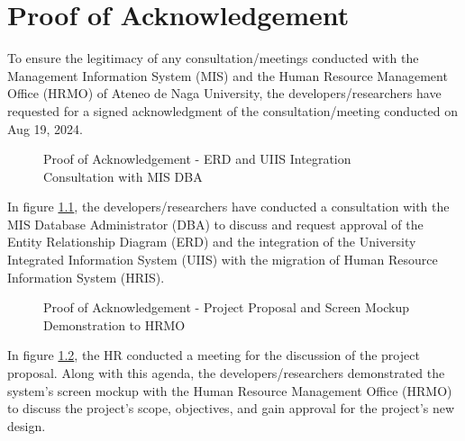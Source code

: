 \chapter{Proof of Acknowledgement}

\label{proof-acknowledgement}

To ensure the legitimacy of any consultation/meetings conducted with the Management Information System (MIS) and the Human Resource Management Office (HRMO) of Ateneo de Naga University, the developers/researchers have requested for a signed acknowledgment of the consultation/meeting conducted on Aug 19, 2024. 

\begin{figure}[H]
    \centering
    \caption{Proof of Acknowledgement - ERD and UIIS Integration Consultation with MIS DBA}
    \label{fig:proof-ack-aug-19}
\end{figure}

In figure \ref{fig:proof-ack-aug-19}, the developers/researchers have conducted a consultation with the MIS Database Administrator (DBA) to discuss and request approval of the Entity Relationship Diagram (ERD) and the integration of the University Integrated Information System (UIIS) with the migration of Human Resource Information System (HRIS).

\begin{figure}[H]
    \centering
    \caption{Proof of Acknowledgement - Project Proposal and Screen Mockup Demonstration to HRMO}
    \label{fig:proof-ack-sept-10}
\end{figure}

In figure \ref{fig:proof-ack-sept-10}, the HR conducted a meeting for the discussion of the project proposal. Along with this agenda, the developers/researchers demonstrated the system's screen mockup with the Human Resource Management Office (HRMO) to discuss the project's scope, objectives, and gain approval for the project's new design.